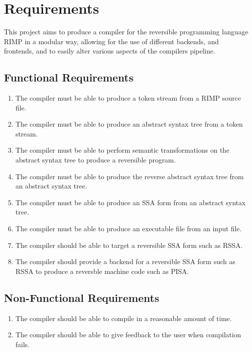 \chapter*{Requirements}

This project aims to produce a compiler for the reversible programming language RIMP in a modular way, allowing for the use of different backends, and frontends, and to easily alter various aspects of the compilers pipeline.

\section*{Functional Requirements}

\begin{enumerate}
    \item The compiler must be able to produce a token stream from a RIMP source file.
    \item The compiler must be able to produce an abstract syntax tree from a token stream.
    \item The compiler must be able to perform semantic transformations on the abstract syntax tree to produce a reversible program.
    \item The compiler must be able to produce the reverse abstract syntax tree from an abstract syntax tree.
    \item The compiler must be able to produce an SSA form from an abstract syntax tree.
    \item The compiler must be able to produce an executable file from an input file.
    \item The compiler should be able to target a reversible SSA form such as RSSA.
    \item The compiler should provide a backend for a reversible SSA form such as RSSA to produce a reversble machine code such as PISA.
\end{enumerate}


\section*{Non-Functional Requirements}

\begin{enumerate}
    \item The compiler should be able to compile in a reasonable amount of time.
    \item The compiler should be able to give feedback to the user when compilation fails.
\end{enumerate}

%
%
%
